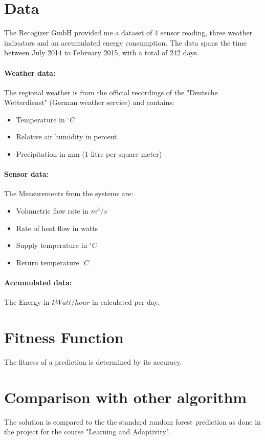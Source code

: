 \documentclass{scrartcl}
\begin{document}
\section{Data}
The Recogizer GmbH provided me a dataset of 4 sensor reading, three weather indicators and an accumulated energy consumption. The data spans the time between July 2014 to February 2015, with a total of 242 days.

\paragraph{Weather data:}
The regional weather is from the official recordings of the "Deutsche Wetterdienst" (German weather service) and contains:

\begin{itemize}
\item Temperature in $^\circ C$
\item Relative air humidity in percent
\item Precipitation in mm (1 litre per square meter)
\end{itemize}

\paragraph{Sensor data:}
The Measurements from the systems are:

\begin{itemize}
\item Volumetric flow rate in $m^3 / s$
\item Rate of heat flow in watts
\item Supply temperature in $^\circ C$
\item Return temperature $^\circ C$
\end{itemize}

\paragraph{Accumulated data:}
The Energy in $k Watt/hour$ in calculated per day.

\section{Fitness Function}
The fitness of a prediction is determined by its accuracy.

\section{Comparison with other algorithm}
The solution is compared to the the standard random forest prediction as done in the project for the course "Learning and Adaptivity".
\end{document}
